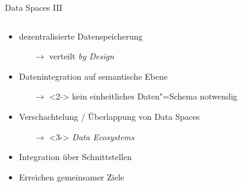 \begin{frame}{Data Spaces III \footnotesize\cite{mollerIndustrialDataEcosystems2024}}
    \begin{columns}
        \begin{column}{0.6\textwidth}
            \begin{itemize}
                \item dezentralisierte Datenspeicherung
                \begin{itemize}
                    \item[$\to$] verteilt \emph{by Design} %
                \end{itemize}
                
                \item<2-> Datenintegration auf semantische Ebene
                \begin{itemize}
                    \item[$\to$]<2-> kein einheitliches Daten"=Schema notwendig
                \end{itemize}
                

                \item<3-> Verschachtelung / Überlappung von Data Spaces
                \begin{itemize}
                    \item[$\to$]<3-> \emph{Data Ecosystems}
                \end{itemize}
                
                \item<4-> Integration über Schnittstellen
                \item<4-> Erreichen gemeinsamer Ziele
            \end{itemize}
        \end{column}


\end{columns}
\end{frame}
